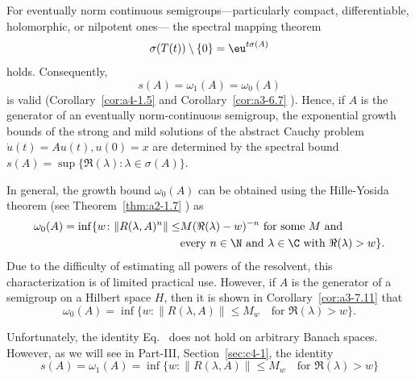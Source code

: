 \begin{remark}\label{rem:a4-1.7}
For eventually norm continuous semigroups---particularly compact, differentiable, holomorphic, or nilpotent ones--- the spectral mapping theorem 
\begin{equation}\label{eq:a4-1.7}
\sigma(T(t)) \setminus \{0\} = \eu^{t \sigma(A)}
\end{equation}
holds. 
Consequently,
\begin{equation}\label{eq:a4-1.8}
s(A) = \omega_1(A) = \omega_{0}(A)
\end{equation}
is valid (Corollary~\ref{cor:a4-1.5} and Corollary~\ref{cor:a3-6.7} ).
Hence, if\/ $A$ is the generator of an eventually norm-continuous semigroup, the exponential growth bounds of the strong and mild solutions of the abstract Cauchy problem $\dot{u}(t) = A u(t), u(0) = x$ are determined by the spectral bound
$s(A) = \sup\{\Re(\lambda)\colon\lambda \in \sigma(A)\}.$
\end{remark}
\begin{remark} In general, the growth bound $\omega_{0}(A)$ can be obtained using the Hille-Yosida theorem (see Theorem~\ref{thm:a2-1.7} ) as
\begin{equation}\label{eq:a4-1.9}
\begin{split}
\omega_{0}(A) = \inf \{ w\colon\|R(\lambda, A)^n\| \leq &M ( \Re(\lambda) - w)^{-n} \text{ for some } M \text{ and}\\
&\text{every } n \in \N \text{ and } \lambda \in \C \text{ with } \Re(\lambda) > w\}. 
\end{split}
\end{equation}
Due to the difficulty of estimating all powers of the resolvent, this characterization is of limited practical use. 
However, if\/ $A$ is the generator of a semigroup on a Hilbert space $H$, then it is shown in Corollary~\ref{cor:a3-7.11}  that
\begin{equation}\label{eq:a4-1.10}
 \omega_{0}(A) = \inf \{ w\colon\| R(\lambda, A) \| \leq M_w \quad \text{for } \Re(\lambda) > w \}.
\end{equation}
\end{remark}
Unfortunately, the identity Eq.~ does not hold on arbitrary Banach spaces. 
However, as we will see in Part-III, Section~\ref{sec:c4-1},  the identity 
\begin{equation}\label{eq:a4-1.11}
 s(A)=\omega_1(A) = \inf \{ w\colon\| R(\lambda, A) \| \leq M_w \quad \text{for } \Re(\lambda) > w \}
\end{equation}
